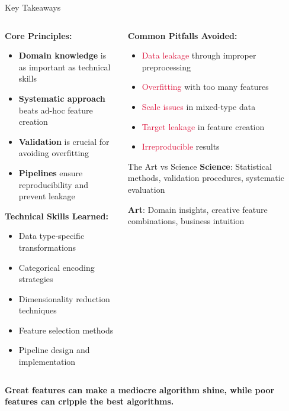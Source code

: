 \documentclass[aspectratio=169,11pt]{beamer}
\begin{document}
\begin{frame}{Key Takeaways}
\begin{columns}
\begin{column}{0.5\textwidth}
\textbf{Core Principles:}
\begin{itemize}
\item \textcolor{forest}{\textbf{Domain knowledge}} is as important as technical skills
\item \textcolor{forest}{\textbf{Systematic approach}} beats ad-hoc feature creation
\item \textcolor{forest}{\textbf{Validation}} is crucial for avoiding overfitting
\item \textcolor{forest}{\textbf{Pipelines}} ensure reproducibility and prevent leakage
\end{itemize}

\vspace{0.3cm}
\textbf{Technical Skills Learned:}
\begin{itemize}
\item Data type-specific transformations
\item Categorical encoding strategies
\item Dimensionality reduction techniques
\item Feature selection methods
\item Pipeline design and implementation
\end{itemize}
\end{column}
\begin{column}{0.5\textwidth}
\textbf{Common Pitfalls Avoided:}
\begin{itemize}
\item \textcolor{crimson}{Data leakage} through improper preprocessing
\item \textcolor{crimson}{Overfitting} with too many features
\item \textcolor{crimson}{Scale issues} in mixed-type data
\item \textcolor{crimson}{Target leakage} in feature creation
\item \textcolor{crimson}{Irreproducible} results
\end{itemize}

\vspace{0.3cm}
\begin{block}{The Art vs Science}
\textbf{Science}: Statistical methods, validation procedures, systematic evaluation

\textbf{Art}: Domain insights, creative feature combinations, business intuition
\end{block}
\end{column}
\end{columns}

\vspace{0.5cm}
\begin{center}
\textcolor{navyblue}{\Large \textbf{Great features can make a mediocre algorithm shine, while poor features can cripple the best algorithms.}}
\end{center}
\end{frame}
\end{document}
